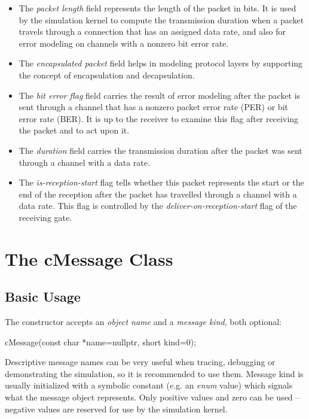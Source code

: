\begin{itemize}
  \item The \textit{packet length} field represents the length of the packet
    in bits. It is used by the simulation kernel to compute the transmission
    duration when a packet travels through a connection that has an assigned
    data rate, and also for error modeling on channels with a nonzero
    bit error rate.
  \item The \textit{encapsulated packet} field helps in modeling protocol layers
    by supporting the concept of encapsulation and decapsulation.
  \item The \textit{bit error flag} field carries the result of error
    modeling after the packet is sent through a channel that has a nonzero
    packet error rate (PER) or bit error rate (BER). It is up to the receiver
    to examine this flag after receiving the packet and to act upon it.
  \item The \textit{duration} field carries the transmission duration after
    the packet was sent through a channel with a data rate.
  \item The \textit{is-reception-start} flag tells whether this packet
    represents the start or the end of the reception after the packet has travelled
    through a channel with a data rate. This flag is controlled by the
    \textit{deliver-on-reception-start} flag of the receiving gate.
\end{itemize}


\section{The cMessage Class}
\label{sec:msgs:cmessage}

\subsection{Basic Usage}
\label{sec:messages:cmessage-basic-usage}

The  constructor accepts an \textit{object name} and a
\textit{message kind}, both optional:

\begin{cpp}
cMessage(const char *name=nullptr, short kind=0);
\end{cpp}

Descriptive message names can be very useful when tracing, debugging or
demonstrating the simulation, so it is recommended to use them.
Message kind is usually initialized with a symbolic constant
(e.g. an \textit{enum} value) which signals what the message object
represents. Only positive values and zero can be used --
negative values are reserved for use by the simulation kernel.

